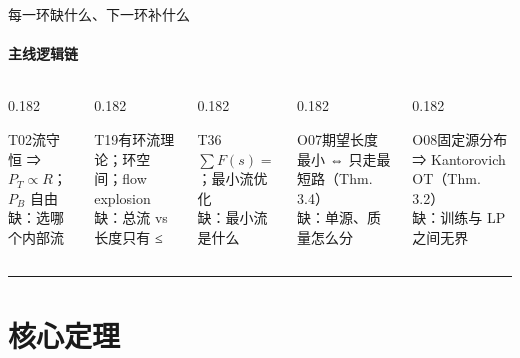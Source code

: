 \documentclass[aspectratio=169,10pt]{beamer}
\begin{document}
\begin{frame}{每一环缺什么、下一环补什么}\framesubtitle{主线逻辑链}
\begin{columns}[T]
\begin{column}{0.182\textwidth}\begin{block}{T02}\footnotesize 流守恒 ⇒ $P_T\propto R$；$P_B$ 自由\\[3pt]\textcolor{negative}{缺：选哪个内部流}\end{block}\end{column}
\begin{column}{0.182\textwidth}\begin{block}{T19}\footnotesize 有环流理论；环空间；flow explosion\\[3pt]\textcolor{negative}{缺：总流 vs 长度只有 ≤}\end{block}\end{column}
\begin{column}{0.182\textwidth}\begin{block}{T36}\footnotesize $\sum F(s)=Z\,\mathbb E[n_\tau]$；最小流优化\\[3pt]\textcolor{negative}{缺：最小流是什么}\end{block}\end{column}
\begin{column}{0.182\textwidth}\begin{block}{O07}\footnotesize 期望长度最小 ⇔ 只走最短路（Thm. 3.4）\\[3pt]\textcolor{negative}{缺：单源、质量怎么分}\end{block}\end{column}
\begin{column}{0.182\textwidth}\begin{block}{O08}\footnotesize 固定源分布 ⇒ Kantorovich OT（Thm. 3.2）\\[3pt]\textcolor{negative}{缺：训练与 LP 之间无界}\end{block}\end{column}
\end{columns}
\vfill\hrule\vspace{2pt}{\footnotesize\textcolor{neutral}{转折点是 T36 的等式：一个流空间上的线性泛函（总流）和一个行为学量（期望步数）被钉在一起，此后 O07/O08 是线性规划课的两道习题。}}
\end{frame}

\section{核心定理}
\end{document}
